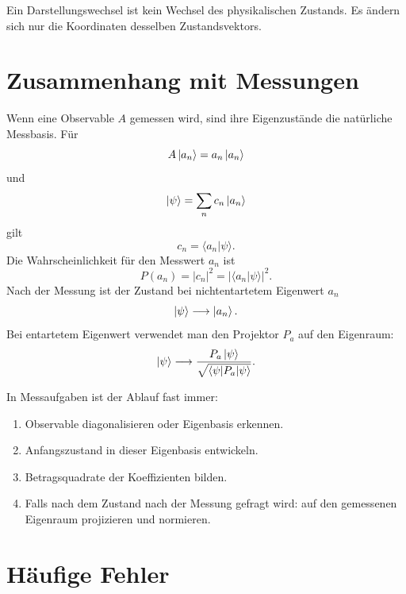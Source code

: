 \begin{conceptbox}
Ein Darstellungswechsel ist kein Wechsel des physikalischen Zustands. Es ändern sich nur die Koordinaten desselben Zustandsvektors.
\end{conceptbox}

\section{Zusammenhang mit Messungen}

Wenn eine Observable $A$ gemessen wird, sind ihre Eigenzustände die natürliche Messbasis. Für
\[
    A\left|a_n\right\rangle=a_n\left|a_n\right\rangle
\]
und
\[
    \left|\psi\right\rangle=\sum_n c_n\left|a_n\right\rangle
\]
gilt
\[
    c_n=\langle a_n|\psi\rangle.
\]
Die Wahrscheinlichkeit für den Messwert $a_n$ ist
\[
    P(a_n)=|c_n|^2=|\langle a_n|\psi\rangle|^2.
\]
Nach der Messung ist der Zustand bei nichtentartetem Eigenwert $a_n$
\[
    \left|\psi\right\rangle\longrightarrow\left|a_n\right\rangle.
\]
Bei entartetem Eigenwert verwendet man den Projektor $P_a$ auf den Eigenraum:
\[
    \left|\psi\right\rangle\longrightarrow\frac{P_a\left|\psi\right\rangle}{\sqrt{\langle\psi|P_a|\psi\rangle}}.
\]

\begin{examtipbox}
In Messaufgaben ist der Ablauf fast immer:
\begin{enumerate}
    \item Observable diagonalisieren oder Eigenbasis erkennen.
    \item Anfangszustand in dieser Eigenbasis entwickeln.
    \item Betragsquadrate der Koeffizienten bilden.
    \item Falls nach dem Zustand nach der Messung gefragt wird: auf den gemessenen Eigenraum projizieren und normieren.
\end{enumerate}
\end{examtipbox}

\section{Häufige Fehler}

